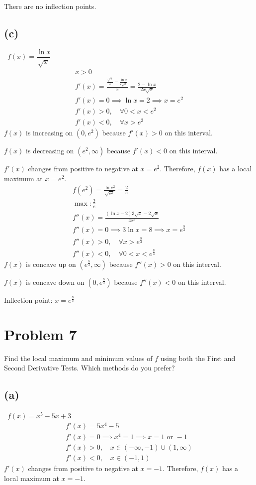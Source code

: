 \documentclass[12pt]{article}
\newcommand{\tor}{\text{ or }}
\newcommand{\vem}{\vspace{0.5em}}
\newcommand{\problem}[1]{\section{Problem #1}}
\newcommand{\subproblem}[1]{\subsection{(#1)} \,}
\begin{document}
There are no inflection points.  \vem 

\subproblem{c}
$f(x)=\dfrac{\ln x}{\sqrt{x}}$
\begin{gather*}
    x>0\\
    f'(x)=\frac{\frac{\sqrt{x}}{x}-\frac{\ln x}{2\sqrt{x}}}{x}=\frac{2-\ln x}{2x\sqrt{x}}\\
    f'(x)=0\implies \ln x=2\implies x=e^2\\
    f'(x)>0, \quad \forall 0<x <e^2\\
    f'(x)<0, \quad \forall x >e^2
\end{gather*}
$f(x)$ is increasing on $(0, e^2)$ because $f'(x)>0$ on this interval.\vem

$f(x)$ is decreasing on $(e^2, \infty)$ because $f'(x)<0$ on this interval. \vem

$f'(x)$ changes from positive to negative at $x=e^2$. Therefore, $f(x)$ has a local maximum at $x=e^2$.
\begin{gather*}
    f(e^2)=\frac{\ln e^2}{\sqrt{e^2}}=\frac{2}{e}\\
    \boxed{\max: \frac{2}{e}}\\
    f''(x)=\frac{(\ln x-2)3\sqrt{x}-2\sqrt{x}}{4x^3}\\
    f''(x)=0 \implies 3\ln x = 8 \implies x= e^{\frac{8}{3}}\\
    f''(x)>0, \quad \forall x > e^{\frac{8}{3}}\\
    f''(x)<0, \quad \forall 0 <x < e^{\frac{8}{3}}
\end{gather*}
$f(x)$ is concave up on $(e^{\frac{8}{3}}, \infty)$ because $f''(x)>0$ on this interval. \vem

$f(x)$ is concave down on $(0, e^{\frac{8}{3}})$ because $f''(x)<0$ on this interval. \vem

Inflection point: $\boxed{x=e^{\frac{8}{3}}}$ \vem

\problem{7}
Find the local maximum and minimum values of $f$ using both the First and Second Derivative Tests. Which methods do you prefer? \vem 

\subproblem{a}
$f(x)=x^5-5x+3$
\begin{gather*}
    f'(x)=5x^4-5\\
    f'(x)=0 \implies x^4=1 \implies x=1 \tor -1\\
    f'(x)>0, \quad x\in (-\infty ,-1) \cup (1,\infty)\\
    f'(x)<0, \quad x\in (-1,1)
\end{gather*}
$f'(x)$ changes from positive to negative at $x=-1$. Therefore, $f(x)$ has a local maximum at $x=-1$. \vem
\end{document}
